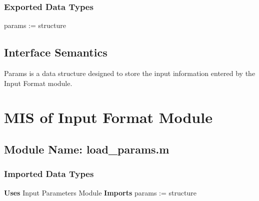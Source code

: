 \documentclass[12pt]{article}
\begin{document}

\subsubsection{Exported Data Types}

params := structure



\subsection{Interface Semantics}

Params is a data structure designed to store the input information entered by the Input Format module.



\section{MIS of Input Format Module}

\subsection{Module Name: load\_{params}.m}



\subsubsection{Imported Data Types}
\textbf{Uses} Input Parameters Module \textbf{Imports} params := structure 

\end{document}
